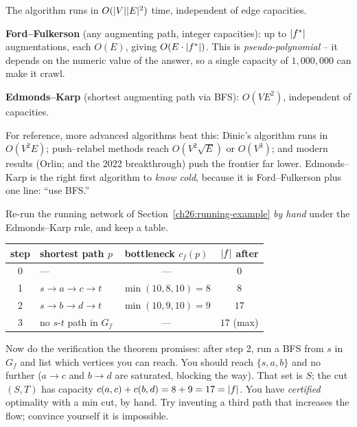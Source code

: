 \begin{theorem}
\label{ch26:ek-time}
The algorithm runs in $O(\lvert V\rvert\lvert E\rvert^2)$ time, independent
of edge capacities.
\end{theorem}

\begin{complexitybox}
\textbf{Ford--Fulkerson} (any augmenting path, integer capacities): up to
$\lvert f^*\rvert$ augmentations, each $O(E)$, giving $O(E\cdot\lvert f^*\rvert)$. This is
\emph{pseudo-polynomial} -- it depends on the numeric value of the answer, so a
single capacity of $1{,}000{,}000$ can make it crawl.

\textbf{Edmonds--Karp} (shortest augmenting path via BFS):
$O(V E^2)$, independent of capacities.

For reference, more advanced algorithms beat this: Dinic's algorithm runs in
$O(V^2 E)$; push--relabel methods reach $O(V^2\sqrt{E})$ or $O(V^3)$; and modern
results (Orlin; and the 2022 breakthrough) push the frontier
far lower. Edmonds--Karp is the right first algorithm to \emph{know
cold}, because it is Ford--Fulkerson plus one line: ``use BFS.''
\end{complexitybox}

\begin{labbox}
Re-run the running network of Section~\ref{ch26:running-example} \emph{by hand}
under the Edmonds--Karp rule, and keep a table.

\begin{center}
\begin{tabular}{c l c c}
\toprule
step & shortest path $p$ & bottleneck $c_f(p)$ & $\lvert f\rvert$ after \\
\midrule
0 & --- & --- & $0$ \\
1 & $s\to a\to c\to t$ & $\min(10,8,10)=8$ & $8$ \\
2 & $s\to b\to d\to t$ & $\min(10,9,10)=9$ & $17$ \\
3 & no $s$-$t$ path in $G_f$ & --- & $17$ (max) \\
\bottomrule
\end{tabular}
\end{center}

Now do the verification the theorem promises: after step 2, run a BFS from $s$
in $G_f$ and list which vertices you can reach. You should reach $\{s,a,b\}$ and
no further ($a\to c$ and $b\to d$ are saturated, blocking the way). That set is
$S$; the cut $(S,T)$ has capacity $c(a,c)+c(b,d) = 8+9 = 17 = \lvert f\rvert$. You have
\emph{certified} optimality with a min cut, by hand. Try inventing a third
path that increases the flow; convince yourself it is impossible.
\end{labbox}

